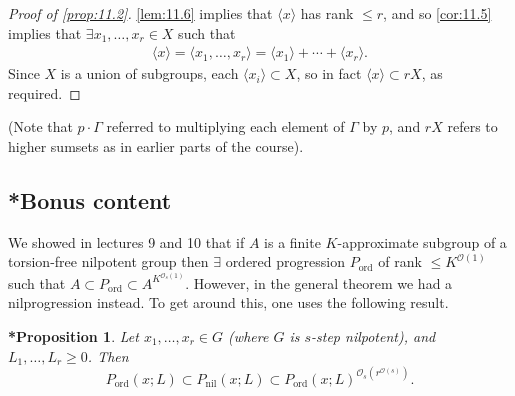 \documentclass{article}
\newtheorem{nprop*}[nthm]{*Proposition}
\numberwithin{equation}{section}
\begin{document}
\begin{proof}[Proof of \cref{prop:11.2}]
  \cref{lem:11.6} implies that $\langle x\rangle$ has rank $\leq r$, and so \cref{cor:11.5} implies that $\exists x_1, \dotsc, x_r \in X$ such that
  \begin{align*}
    \langle x \rangle = \langle x_1, \dotsc, x_r \rangle = \langle x_1 \rangle + \dotsb + \langle x_r \rangle.
  \end{align*}
  Since $X$ is a union of subgroups, each $\langle x_i \rangle \subset X$, so in fact $\langle x \rangle \subset rX$, as required.
\end{proof}
(Note that $p \cdot \Gamma$ referred to multiplying each element of $\Gamma$ by $p$, and $rX$ refers to higher sumsets as in earlier parts of the course).
\color{gray}
\subsection*{*Bonus content}
We showed in lectures 9 and 10 that if $A$ is a finite $K$-approximate subgroup of a torsion-free nilpotent group then $\exists$ ordered progression $P_{\text{ord}}$ of rank $\leq K^{\mathcal{O}(1)}$ such that $A \subset P_{\text{ord}} \subset A^{K^{\mathcal{O}_s(1)}}$.
However, in the general theorem we had a nilprogression instead.
To get around this, one uses the following result.
\begin{nprop*}\label{prop:11.7}
  Let $x_1, \dotsc, x_r \in G$ (where $G$ is $s$-step nilpotent), and $L_1, \dotsc, L_r \geq 0$.
  Then
  \begin{equation*}
    P_{\text{ord}}(x;L) \subset P_{\text{nil}}(x;L) \subset P_{\text{ord}}(x;L)^{\mathcal{O}_s(r^{\mathcal{O}(s)})}.
  \end{equation*}
\end{nprop*}
\color{black}
\printindex
\end{document}
